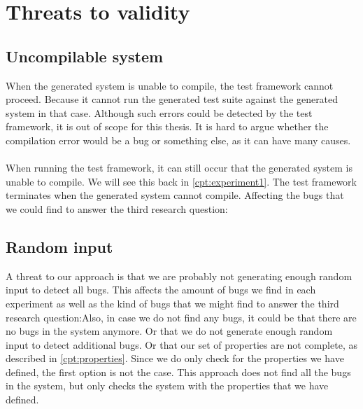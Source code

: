 \section{Threats to validity}

\subsection*{Uncompilable system}
When the generated system is unable to compile, the test framework cannot
proceed. Because it cannot run the generated test suite against the generated
system in that case. Although such errors could be detected by the test
framework, it is out of scope for this thesis. It is hard to argue whether the
compilation error would be a bug or something else, as it can have many causes.\\
\\
When running the test framework, it can still occur that the generated system is unable to compile. We will
see this back in \autoref{cpt:experiment1}. The test framework terminates when the generated system cannot compile. Affecting the bugs that we could find to answer the third research question:\rqThree

\subsection*{Random input}
A threat to our approach is that we are probably not generating enough random input to detect all bugs. This affects the amount of bugs we find in each experiment as well as the kind of bugs that we might find to answer the third research question:\rqThree Also, in case we do not find any bugs, it could be that there are no bugs in the system anymore. Or that we do not generate enough random input to detect additional bugs. Or that our set of properties are not complete, as described in \autoref{cpt:properties}. Since we do only check for the properties we have defined, the first option is not the case. This approach does not find all the bugs in the system, but only checks the system with the properties that we have defined.

